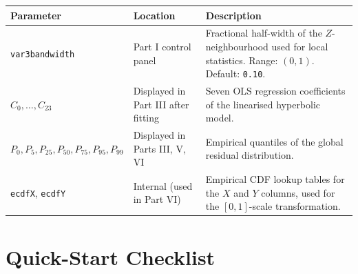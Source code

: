 \documentclass[12pt,a4paper]{article}
\begin{document}
\begin{center}
\renewcommand{\arraystretch}{1.4}
\begin{tabular}{@{}lp{4cm}p{7cm}@{}}
\toprule
\textbf{Parameter} & \textbf{Location} & \textbf{Description} \\
\midrule
\texttt{var3bandwidth} &
    Part I control panel &
    Fractional half-width of the $Z$-neighbourhood used for local statistics.
    Range: $(0,1)$.  Default: \texttt{0.10}. \\
$C_0,\dots,C_{23}$ &
    Displayed in Part III after fitting &
    Seven OLS regression coefficients of the linearised hyperbolic model. \\
$P_0, P_5, P_{25}, P_{50}, P_{75}, P_{95}, P_{99}$ &
    Displayed in Parts III, V, VI &
    Empirical quantiles of the global residual distribution. \\
\texttt{ecdfX}, \texttt{ecdfY} &
    Internal (used in Part VI) &
    Empirical CDF lookup tables for the $X$ and $Y$ columns, used for the
    $[0,1]$-scale transformation. \\
\bottomrule
\end{tabular}
\end{center}

\section{Quick-Start Checklist}
\end{document}
